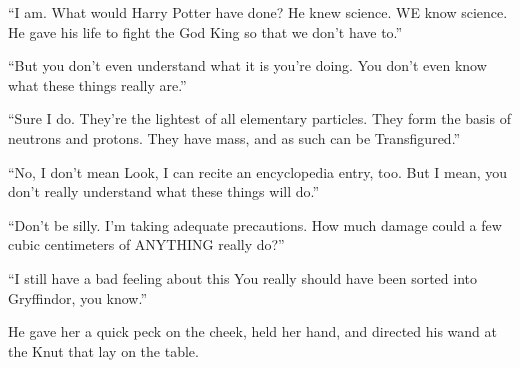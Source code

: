 “I am. What would Harry Potter have done? He knew science. WE know science. He gave his life to fight the God King so that we don’t have to.”

“But you don’t even understand what it is you’re doing. You don’t even know what these things really are.”

“Sure I do. They’re the lightest of all elementary particles. They form the basis of neutrons and protons. They have mass, and as such can be Transfigured.”

“No, I don’t mean{\el} Look, I can recite an encyclopedia entry, too. But I mean, you don’t really understand what these things will do.”

“Don’t be silly. I’m taking adequate precautions. How much damage could a few cubic centimeters of ANYTHING really do?”

“I still have a bad feeling about this{\el} You really should have been sorted into Gryffindor, you know.”

He gave her a quick peck on the cheek, held her hand, and directed his wand at the Knut that lay on the table.


